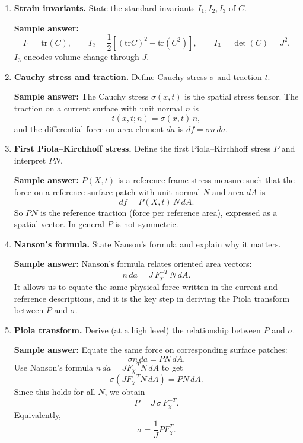 \documentclass[12pt]{article}
\begin{document}
\begin{enumerate}
\item \textbf{Strain invariants.}
State the standard invariants $I_1,I_2,I_3$ of $C$.

\textbf{Sample answer:}
\[
I_1=\mathrm{tr}(C),\qquad
I_2=\frac12\left[(\mathrm{tr}C)^2-\mathrm{tr}(C^2)\right],\qquad
I_3=\det(C)=J^2.
\]
$I_3$ encodes volume change through $J$.

\item \textbf{Cauchy stress and traction.}
Define Cauchy stress $\sigma$ and traction $t$.

\textbf{Sample answer:}
The Cauchy stress $\sigma(x,t)$ is the spatial stress tensor.
The traction on a current surface with unit normal $n$ is
\[
t(x,t;n) = \sigma(x,t)\, n,
\]
and the differential force on area element $da$ is $df=\sigma n\, da$.

\item \textbf{First Piola--Kirchhoff stress.}
Define the first Piola--Kirchhoff stress $P$ and interpret $P N$.

\textbf{Sample answer:}
$P(X,t)$ is a reference-frame stress measure such that the force on a reference surface patch
with unit normal $N$ and area $dA$ is
\[
df = P(X,t)\,N\, dA.
\]
So $P N$ is the reference traction (force per reference area), expressed as a spatial vector.
In general $P$ is not symmetric.

\item \textbf{Nanson's formula.}
State Nanson's formula and explain why it matters.

\textbf{Sample answer:}
Nanson's formula relates oriented area vectors:
\[
n\, da = J\,F_\chi^{-T}\,N\, dA.
\]
It allows us to equate the same physical force written in the current and reference descriptions,
and it is the key step in deriving the Piola transform between $P$ and $\sigma$.

\item \textbf{Piola transform.}
Derive (at a high level) the relationship between $P$ and $\sigma$.

\textbf{Sample answer:}
Equate the same force on corresponding surface patches:
\[
\sigma n\, da = P N\, dA.
\]
Use Nanson's formula $n\, da = JF_\chi^{-T}N\, dA$ to get
\[
\sigma(JF_\chi^{-T}N\, dA)=PN\, dA.
\]
Since this holds for all $N$, we obtain
\[
P = J\,\sigma\,F_\chi^{-T}.
\]
Equivalently,
\[
\sigma = \frac{1}{J}P F_\chi^{T}.
\]


\end{enumerate}
\end{document}
